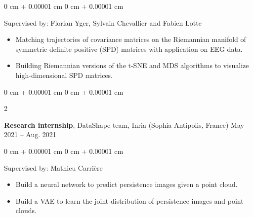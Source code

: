 \documentclass[10pt, letterpaper]{article}
\newenvironment{highlights}{
    \begin{itemize}[
        topsep=0.10 cm,
        parsep=0.10 cm,
        partopsep=0pt,
        itemsep=0pt,
        leftmargin=0 cm + 10pt
    ]
}{
    \end{itemize}
} %
\newenvironment{onecolentry}{
    \begin{adjustwidth}{
        0 cm + 0.00001 cm
    }{
        0 cm + 0.00001 cm
    }
}{
    \end{adjustwidth}
} %
\newenvironment{twocolentry}[2][]{
    \onecolentry
    \def\secondColumn{#2}
    \setcolumnwidth{\fill, 4.5 cm}
    \begin{paracol}{2}
}{
    \switchcolumn \raggedleft \secondColumn
    \end{paracol}
    \endonecolentry
} %
\begin{document}
        \vspace{0.10 cm}
        \begin{onecolentry}
            Supervised by: Florian Yger, Sylvain Chevallier and Fabien Lotte
            \begin{highlights}
                \item Matching trajectories of covariance matrices on the Riemannian manifold of symmetric definite positive (SPD) matrices with application on EEG data.
                \item Building Riemannian versions of the t-SNE and MDS algorithms to visualize high-dimensional SPD matrices.
            \end{highlights}
        \end{onecolentry}


        \vspace{0.2 cm}

        \begin{twocolentry}{
            May 2021 – Aug. 2021
        }
            \textbf{Research internship}, DataShape team, Inria (Sophia-Antipolis, France) \end{twocolentry}

        \vspace{0.10 cm}
        \begin{onecolentry}
            Supervised by: Mathieu Carrière 
            \begin{highlights}
                \item Build a neural network to predict persistence images given a point cloud.
                \item Build a VAE to learn the joint distribution of persistence images and point clouds.
            \end{highlights}
        \end{onecolentry}



    
\end{document}
